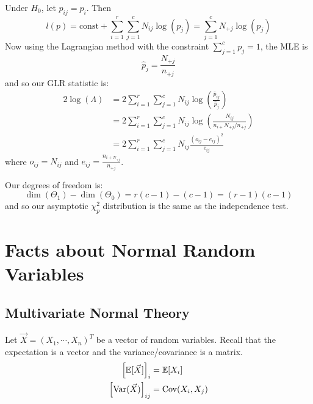 \documentclass[../Main.tex]{subfiles}
\begin{document}
\begin{example}
    Under $H_0$, let $p_{ij} = p_i$. Then
    \begin{equation*}
        l(p) = \text{const} + \sum_{i=1}^{r} \sum_{j=1}^{c} N_{ij} \log(p_j) = \sum_{j=1}^{c} N_{+j} \log(p_j)
    \end{equation*}
    Now using the Lagrangian method with the constraint $\sum_{j=1}^{c} p_j = 1$, the MLE is
    \begin{equation*}
        \hat{p}_j = \frac{N_{+j}}{n_{+j}}
    \end{equation*}
    and so our GLR statistic is:
    \begin{align*}
        2\log(\Lambda) &= 2\sum_{i=1}^{r}\sum_{j=1}^{c} N_{ij} \log\left(\frac{\hat{p}_{ij}}{\hat{p}_j}\right) \\
        &= 2\sum_{i=1}^{r}\sum_{j=1}^{c} N_{ij} \log\left(\frac{N_{ij}}{n_{i+} N_{+j} / n_{+j}}\right) \\
        &= 2\sum_{i=1}^{r}\sum_{j=1}^{c} N_{ij} \frac{(o_{ij} - e_{ij})^2}{e_{ij}}
    \end{align*}
    where $o_{ij} = N_{ij}$ and $e_{ij} = \frac{n_{i+ N_{+j}}}{n_{+j}}$.

    Our degrees of freedom is:
    \begin{equation*}
        \dim(\Theta_1) - \dim(\Theta_0) = r(c-1) - (c-1) = (r-1)(c-1)
    \end{equation*}
    and so our asymptotic $\chi_p^2$ distribution is the same as the independence test.
\end{example}
\section{Facts about Normal Random Variables}
\subsection{Multivariate Normal Theory}
Let $\vec{X} = (X_1, \cdots, X_n)^T$ be a vector of random variables. Recall that the expectation is a vector and the variance/covariance is a matrix.
\begin{align*}
    \left[\mathbb{E}[\vec{X}]\right]_i &= \mathbb{E}[X_i] \\
    \left[\operatorname{Var}(\vec{X})\right]_{ij} &= \operatorname{Cov}(X_i, X_j)
\end{align*}
\end{document}
